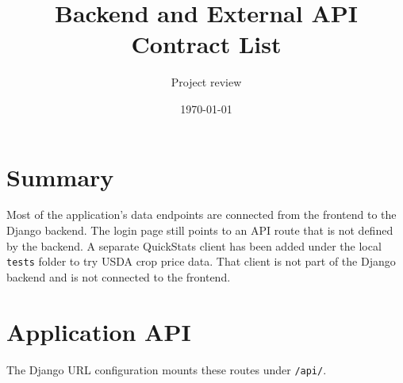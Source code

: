 \documentclass[11pt]{article}
\title{Backend and External API Contract List}
\author{Project review}
\date{\today}
\begin{document}
\maketitle

\section*{Summary}

Most of the application's data endpoints are connected from the frontend to the Django backend. The login page still points to an API route that is not defined by the backend. A separate QuickStats client has been added under the local \texttt{tests} folder to try USDA crop price data. That client is not part of the Django backend and is not connected to the frontend.

\section*{Application API}

The Django URL configuration mounts these routes under \texttt{/api/}.
\end{document}
